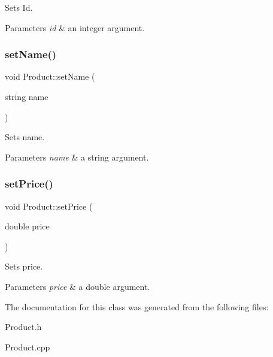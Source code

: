 Sets Id. 


\begin{DoxyParams}{Parameters}
{\em id} & an integer argument. \\
\hline
\end{DoxyParams}
\mbox{\label{classProduct_ae5aa54c86d99f87b2b6bca4aa1a0479f}} 
\subsubsection{\texorpdfstring{set\+Name()}{setName()}}
{\footnotesize\ttfamily void Product\+::set\+Name (\begin{DoxyParamCaption}\item[{string}]{name }\end{DoxyParamCaption})}



Sets name. 


\begin{DoxyParams}{Parameters}
{\em name} & a string argument. \\
\hline
\end{DoxyParams}
\mbox{\label{classProduct_aacd8e249939d497c95881ae859280d48}} 
\subsubsection{\texorpdfstring{set\+Price()}{setPrice()}}
{\footnotesize\ttfamily void Product\+::set\+Price (\begin{DoxyParamCaption}\item[{double}]{price }\end{DoxyParamCaption})}



Sets price. 


\begin{DoxyParams}{Parameters}
{\em price} & a double argument. \\
\hline
\end{DoxyParams}


The documentation for this class was generated from the following files\+:\begin{DoxyCompactItemize}
\item 
Product.\+h\item 
Product.\+cpp\end{DoxyCompactItemize}
